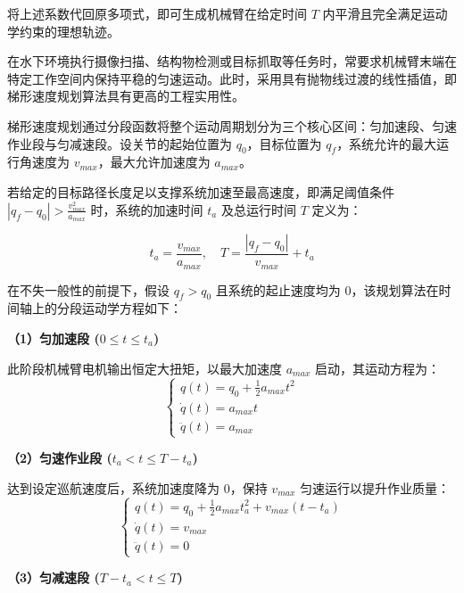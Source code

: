 将上述系数代回原多项式，即可生成机械臂在给定时间 $T$ 内平滑且完全满足运动学约束的理想轨迹。


在水下环境执行摄像扫描、结构物检测或目标抓取等任务时，常要求机械臂末端在特定工作空间内保持平稳的匀速运动。此时，采用具有抛物线过渡的线性插值，即梯形速度规划算法具有更高的工程实用性。

梯形速度规划通过分段函数将整个运动周期划分为三个核心区间：匀加速段、匀速作业段与匀减速段。设关节的起始位置为 $q_0$，目标位置为 $q_f$，系统允许的最大运行角速度为 $v_{max}$，最大允许加速度为 $a_{max}$。

若给定的目标路径长度足以支撑系统加速至最高速度，即满足阈值条件 $|q_f - q_0| > \frac{v_{max}^2}{a_{max}}$ 时，系统的加速时间 $t_a$ 及总运行时间 $T$ 定义为：

\begin{equation}
    t_a = \frac{v_{max}}{a_{max}}, \quad T = \frac{|q_f - q_0|}{v_{max}} + t_a
\end{equation}

在不失一般性的前提下，假设 $q_f > q_0$ 且系统的起止速度均为 $0$，该规划算法在时间轴上的分段运动学方程如下：

\textbf{（1）匀加速段 ($0 \le t \le t_a$)}

此阶段机械臂电机输出恒定大扭矩，以最大加速度 $a_{max}$ 启动，其运动方程为：
\begin{equation}
    \begin{cases}
        q(t) = q_0 + \frac{1}{2} a_{max} t^2 \\
        \dot{q}(t) = a_{max} t \\
        \ddot{q}(t) = a_{max}
    \end{cases}
\end{equation}

\textbf{（2）匀速作业段 ($t_a < t \le T - t_a$)}

达到设定巡航速度后，系统加速度降为 $0$，保持 $v_{max}$ 匀速运行以提升作业质量：
\begin{equation}
    \begin{cases}
        q(t) = q_0 + \frac{1}{2} a_{max} t_a^2 + v_{max} (t - t_a) \\
        \dot{q}(t) = v_{max} \\
        \ddot{q}(t) = 0
    \end{cases}
\end{equation}

\textbf{（3）匀减速段 ($T - t_a < t \le T$)}

